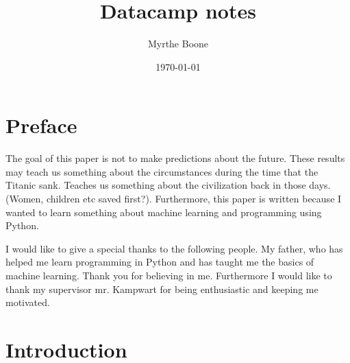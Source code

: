 \documentclass[11pt]{article}
\author{Myrthe Boone}
\date{\today}
\title{Datacamp notes}
\begin{document}
\tableofcontents



\section{Preface}
\label{sec:org509632e}

The goal of this paper is not to make predictions about the future. These results may teach us something about the circumstances during the time that the Titanic sank. Teaches us something about the civilization back in those days. (Women, children etc saved first?). Furthermore, this paper is written because I wanted to learn something about machine learning and programming using Python. 

I would like to give a special thanks to the following people. My father, who has helped me learn programming in Python and has taught me the basics of machine learning. Thank you for believing in me. Furthermore I would like to thank my supervisor mr. Kampwart for being enthusiastic and keeping me motivated. 

\section{Introduction}
\label{sec:orgd9167a3}
\end{document}
